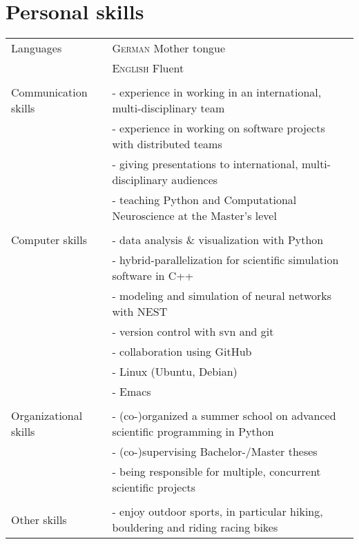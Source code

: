 \documentclass[a4paper,10pt]{article}
\begin{document}
\section{Personal skills}

\begin{tabular}{>{\hfill}p{3.3cm}|p{10.4cm}}
Languages & \textsc{German} Mother tongue \\
& \textsc{English} Fluent \\
  \multicolumn{2}{c}{} \\
Communication skills & - experience in working in an international, multi-disciplinary team \\
& - experience in working on software projects with distributed teams \\
& - giving presentations to international, multi-disciplinary audiences \\
& - teaching Python and Computational Neuroscience at the Master's level \\
  \multicolumn{2}{c}{} \\
Computer skills & - data analysis \& visualization with Python \\
& - hybrid-parallelization for scientific simulation software in C++ \\
& - modeling and simulation of neural networks with NEST \\
& - version control with svn and git \\
& - collaboration using GitHub \\
& - Linux (Ubuntu, Debian) \\
& - Emacs \\
  \multicolumn{2}{c}{} \\
Organizational skills & - (co-)organized a summer school on advanced scientific programming in Python \\
& - (co-)supervising Bachelor-/Master theses \\
& - being responsible for multiple, concurrent scientific projects \\
  \multicolumn{2}{c}{} \\
Other skills & - enjoy outdoor sports, in particular hiking, bouldering and riding racing bikes
\end{tabular}
\end{document}
